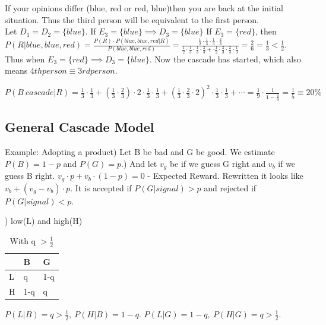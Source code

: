 \documentclass[12pt]{scrartcl}
\begin{document}
If your opinions differ (blue, red or red, blue)then you are back at the initial situation. Thus the third person will be equivalent to the first person.\\


\noindent Let $D_{1} = D_{2} = \{blue\}$. If $E_{3} = \{blue\} \implies D_{3} = \{blue\}$ 
If $E_{3} = \{red\}$, then $P(R|blue,blue,red) = \frac{P(R)\cdot P(blue,blue,red | R)}{P(blue,blue,red)} = \frac{\frac{1}{2}\cdot \frac{1}{3}\cdot \frac{1}{3}\cdot \frac{2}{3}}{\frac{1}{2}\cdot \frac{1}{3}\cdot \frac{1}{3}\cdot \frac{2}{3} + \cdot \frac{1}{2}\cdot \frac{2}{3}\cdot \frac{2}{3}\cdot \frac{1}{3}} = \frac{2}{6} = \frac{1}{3} < \frac{1}{2}$.
Thus when $E_{3} = \{red\} \implies D_{3} = \{blue\}$.
Now the cascade has started, which also means $4th person \equiv 3rd person$.



\noindent$P(B\ cascade| R) = \frac{1}{3}\cdot \frac{1}{3} + (\frac{1}{3}\cdot \frac{2}{3})\cdot 2\cdot \frac{1}{3}\cdot \frac{1}{3} + 
(\frac{1}{3}\cdot \frac{2}{3}\cdot 2)^{2}\cdot \frac{1}{3}\cdot \frac{1}{3} + \cdots
= \frac{1}{9}\cdot \frac{1}{1 - \frac{4}{9}} = \frac{1}{5} \equiv 20\%$
\subsection{General Cascade Model}
Example: Adopting a product) Let B be bad and G be good. We estimate $P(B) = 1-p$ and $P(G) = p$.) And let $v_{g}$ be if we guess G right and $v_{b}$ if we guess B right.\newline
$v_{g}\cdot p + v_{b}\cdot (1-p) = 0$ - Expected Reward. Rewritten it looks like $v_{b} + (v_{g} - v_{b})\cdot p$.\newline
It is accepted if $P(G|signal) > p$ and rejected if $P(G | signal) < p$.

) low(L) and high(H)
\begin{table}[h]
\centering
\begin{tabular}{|l|l|l|}
\hline
  & B   & G   \\\hline
L & q   & 1-q \\\hline
H & 1-q & q  \\\hline
\end{tabular}
\caption{With q $> \frac{1}{2}$}
\label{my-label}
\end{table}

\noindent $P(L|B) = q > \frac{1}{2},\ P(H|B) = 1-q$. $P(L|G) = 1-q,\ P(H|G) = q > \frac{1}{2}$.\newline
\end{document}
